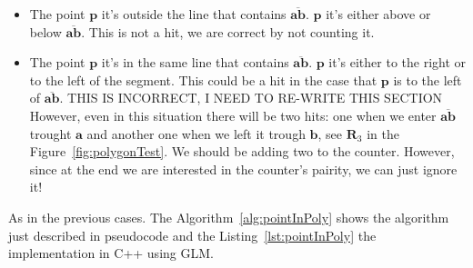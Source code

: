 \begin{itemize}
  \item The point $\mathbf{p}$ it's outside the line that contains $\overline{\mathbf{a}\mathbf{b}}$.
  $\mathbf{p}$ it's either above or below $\overline{\mathbf{a}\mathbf{b}}$.
  This is not a hit, we are correct by not counting it.
  \item The point $\mathbf{p}$ it's in the same line that contains $\overline{\mathbf{a}\mathbf{b}}$.
  $\mathbf{p}$ it's either to the right or to the left of the segment.
  This could be a hit in the case that $\mathbf{p}$ is to the left of $\overline{\mathbf{a}\mathbf{b}}$.
  THIS IS INCORRECT, I NEED TO RE-WRITE THIS SECTION
  However, even in this situation there will be two hits: one when we enter $\overline{\mathbf{a}\mathbf{b}}$ trought $\mathbf{a}$ and another one when we left it trough $\mathbf{b}$, see $\mathbf{R}_3$ in the Figure~\ref{fig:polygonTest}.
  We should be adding two to the counter.
  However, since at the end we are interested in the counter's pairity, we can just ignore it!
\end{itemize}

As in the previous cases. The Algorithm~\ref{alg:pointInPoly} shows the algorithm just described in pseudocode and the Listing~\ref{lst:pointInPoly} the implementation in C++ using GLM.


